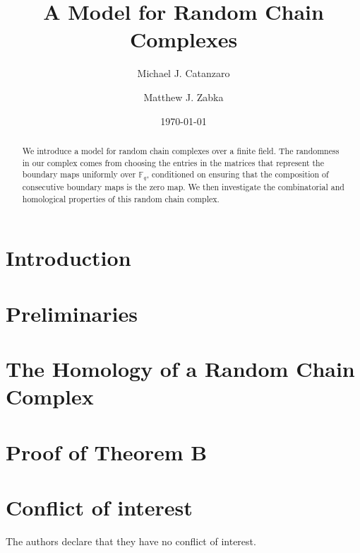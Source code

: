 \documentclass[smallextended]{svjour3}
\begin{document}
\title{A Model for Random Chain Complexes}
\author{Michael J. Catanzaro \and Matthew J. Zabka}
\date{\today}

\maketitle
\begin{abstract}
We introduce a model for random chain complexes over a finite
field. The randomness in our complex comes from choosing the entries in the
matrices that represent the boundary maps uniformly over $\mathbb{F}_q$,
conditioned on ensuring that the composition of consecutive boundary maps is
the zero map.  We then investigate the combinatorial and homological 
properties of this random chain complex.
\end{abstract}


\section{Introduction}

\section{Preliminaries}

\section{The Homology of a Random Chain Complex}\label{SecCondComp}

\section{Proof of Theorem B}

%

 \section*{Conflict of interest}

 The authors declare that they have no conflict of interest.




  
\end{document}
